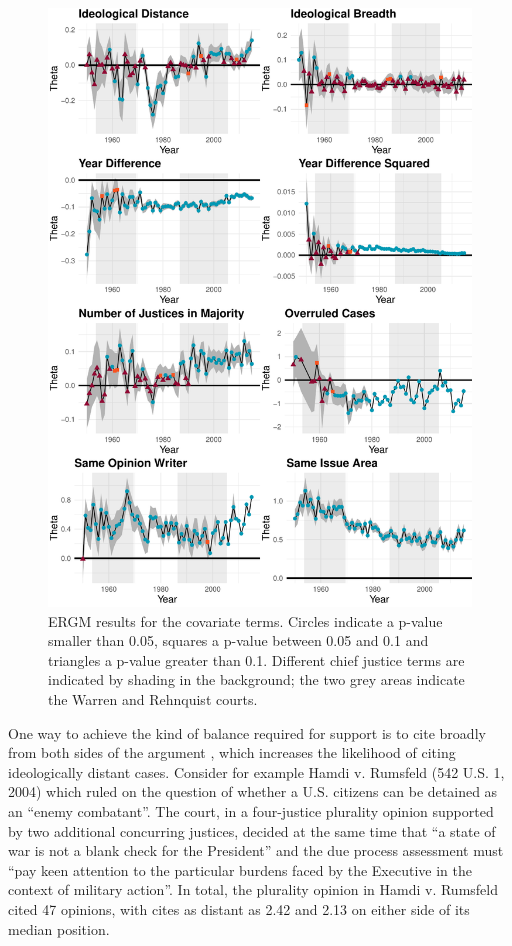 \documentclass[headsepline=true, abstracton]{scrartcl}
\begin{document}
\begin{figure}
	\centering
	\includegraphics[width=14cm ]{SCC_results_2.pdf}
	\caption{ERGM results for the covariate terms. Circles indicate a p-value smaller than 0.05, squares a p-value between 0.05 and 0.1 and triangles a p-value greater than 0.1. Different chief justice terms are indicated by shading in the background; the two grey areas indicate the Warren and Rehnquist courts.}
	\label{SCC_results_2}
\end{figure}

One way to achieve the kind of balance required for support is to cite broadly from both sides of the argument \citep{wilkinson2005rehnquist}, which increases the likelihood of citing ideologically distant cases. Consider for example Hamdi v. Rumsfeld (542 U.S. 1, 2004) which ruled on the question of whether a U.S. citizens can be detained as an ``enemy combatant''. The court, in a four-justice plurality opinion supported by two additional concurring justices, decided at the same time that ``a state of war is not a blank check for the President'' and the due process assessment must ``pay keen attention to the particular burdens faced by the Executive in the context of military action''. In total, the plurality opinion in Hamdi v. Rumsfeld cited 47 opinions, with cites as distant as 2.42 and 2.13 on either side of its median position.
\end{document}
